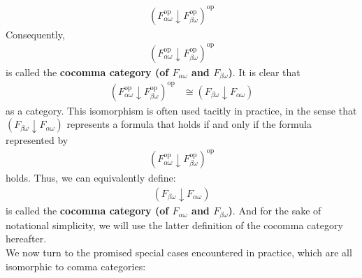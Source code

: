 \begin{align*}
  \left(
    F_{\alpha\omega}^{\mathrm{op}}
    \downarrow
    F_{\beta\omega}^{\mathrm{op}}
  \right)^{\mathrm{op}}
\end{align*}
Consequently,
\begin{align*}
  \left(
    F_{\alpha\omega}^{\mathrm{op}}
    \downarrow
    F_{\beta\omega}^{\mathrm{op}}
  \right)^{\mathrm{op}}
\end{align*}
is called the \textbf{cocomma category (of $F_{\alpha\omega}$ and $F_{\beta\omega}$)}.
It is clear that
\begin{align*}
  \left(
    F_{\alpha\omega}^{\mathrm{op}}
    \downarrow
    F_{\beta\omega}^{\mathrm{op}}
  \right)^{\mathrm{op}}
  &\cong
  (F_{\beta\omega} \downarrow F_{\alpha\omega})
\end{align*}
as a category.
This isomorphism is often used tacitly in practice, in the sense that $(F_{\beta\omega} \downarrow F_{\alpha\omega})$ represents a formula that holds if and only if the formula represented by
\begin{align*}
  \left(
    F_{\alpha\omega}^{\mathrm{op}}
    \downarrow
    F_{\beta\omega}^{\mathrm{op}}
  \right)^{\mathrm{op}}
\end{align*}
holds.
Thus, we can equivalently define:
\begin{align*}
  (F_{\beta\omega} \downarrow F_{\alpha\omega})
\end{align*}
is called the \textbf{cocomma category (of $F_{\alpha\omega}$ and $F_{\beta\omega}$)}.
And for the sake of notational simplicity, we will use the latter definition of the cocomma category hereafter.
\\
We now turn to the promised special cases encountered in practice, which are all isomorphic to comma categories:

